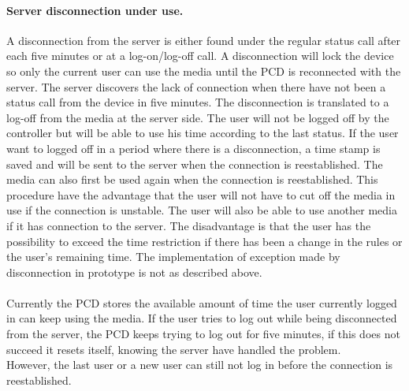 \paragraph{Server disconnection under use.}
\label{sec:ServerDisconnectionUnderUse}
A disconnection from the server is either found under the regular status call after each five minutes or at a log-on/log-off call. A disconnection will lock the device so only the current user can use the media until the PCD is reconnected with the server. The server discovers the lack of connection when there have not been a status call from the device in five minutes. The disconnection is translated to a log-off from the media at the server side. 
The user will not be logged off by the controller but will be able to use his time according to the last status. If the user want to logged off in a period where there is a disconnection, a time stamp is saved and will be sent to the server when the connection is reestablished. The media can also first be used again when the connection is reestablished. 
This procedure have the advantage that the user will not have to cut off the media in use if the connection is unstable. The user will also be able to use another media if it has connection to the server.
The disadvantage is that the user has the possibility to exceed the time restriction if there has been a change in the rules or the user's remaining time. \newline
The implementation of exception made by disconnection in prototype is not as described above.\\
\\
Currently the PCD stores the available amount of time the user currently logged in can keep using the media. 
If the user tries to log out while being disconnected from the server, the PCD keeps trying to log out for five minutes, if this does not succeed it resets itself, knowing the server have handled the problem.\\
However, the last user or a new user can still not log in before the connection is reestablished.\\
\\